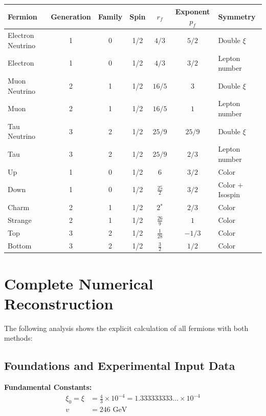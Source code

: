 	\scriptsize
\begin{tabular}{|l|c|c|c|c|c|l|}
		\hline
		Fermion & Generation & Family & Spin & $r_f$ & Exponent $p_f$ & Symmetry \\
		\hline
		Electron Neutrino & 1 & 0 & 1/2 & $4/3$ & $5/2$ & Double $\xi$ \\
		Electron          & 1 & 0 & 1/2 & $4/3$  & $3/2$ & Lepton number \\
		Muon Neutrino     & 2 & 1 & 1/2 & $16/5$ & $3$ & Double $\xi$ \\
		Muon              & 2 & 1 & 1/2 & $16/5$ & $1$   & Lepton number \\
		Tau Neutrino      & 3 & 2 & 1/2 & $25/9$ & $25/9$ & Double $\xi$ \\
		Tau               & 3 & 2 & 1/2 & $25/9$ & $2/3$ & Lepton number \\
		\hline
		Up     & 1 & 0 & 1/2 & $6$          & $3/2$ & Color \\
		Down   & 1 & 0 & 1/2 & $\tfrac{25}{2}$ & $3/2$ & Color + Isospin \\
		Charm  & 2 & 1 & 1/2 & $2$$^*$          & $2/3$ & Color \\
		Strange& 2 & 1 & 1/2 & $\tfrac{26}{9}$ & $1$   & Color \\
		Top    & 3 & 2 & 1/2 & $\tfrac{1}{28}$ & $-1/3$ & Color \\
		Bottom & 3 & 2 & 1/2 & $\tfrac{3}{2}$  & $1/2$ & Color \\
		\hline
	\end{tabular}
\normalsize
	
	
	\section{Complete Numerical Reconstruction}
	\label{sec:complete_reconstruction}
	
	The following analysis shows the explicit calculation of all fermions with both methods:
	
	\subsection{Foundations and Experimental Input Data}
	\label{subsec:foundations}
	
	\textbf{Fundamental Constants:}
	\begin{align}
		\xi_0 = \xi &= \frac{4}{3} \times 10^{-4} = 1.333333333... \times 10^{-4} \\
		v &= 246 \text{ GeV}
	\end{align}
	
